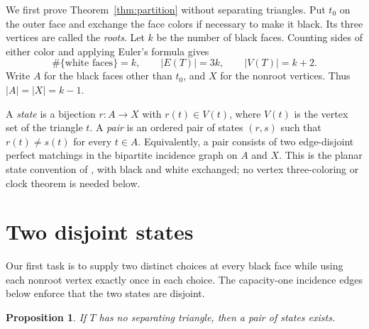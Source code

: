 \documentclass[11pt]{article}
\newtheorem{proposition}[theorem]{Proposition}
\theoremstyle{remark}
\newcommand{\abs}[1]{\left|#1\right|}
\numberwithin{equation}{section}
\begin{document}
We first prove Theorem~\ref{thm:partition} without separating
triangles. Put \(t_0\) on the outer face and exchange the face
colors if necessary to make it black. Its three vertices are
called the \emph{roots}. Let \(k\) be the number of black faces.
Counting sides of either color and applying Euler's formula gives
\begin{equation}\label{eq:counts}
 \#\{\text{white faces}\}=k,\qquad
 \abs{E(T)}=3k,\qquad \abs{V(T)}=k+2.
\end{equation}
Write \(A\) for the black faces other than \(t_0\), and \(X\)
for the nonroot vertices. Thus \(\abs{A}=\abs{X}=k-1\).

A \emph{state} is a bijection \(r:A\longrightarrow X\) with
\(r(t)\in V(t)\), where \(V(t)\) is the vertex set of the
triangle \(t\). A \emph{pair} is an ordered pair of states
\((r,s)\) such that \(r(t)\ne s(t)\) for every \(t\in A\).
Equivalently, a pair consists of two edge-disjoint perfect
matchings in the bipartite incidence graph on \(A\) and \(X\).
This is the planar state convention of \citet[Section~1]{HK2018},
with black and white exchanged; no vertex three-coloring or clock
theorem is needed below.

\section{Two disjoint states}\label{sec:pairs}

Our first task is to supply two distinct choices at every black face
while using each nonroot vertex exactly once in each choice. The capacity-one
incidence edges below enforce that the two states are disjoint.

\begin{proposition}\label{prop:pairs}
If \(T\) has no separating triangle, then a pair of states exists.
\end{proposition}
\end{document}
